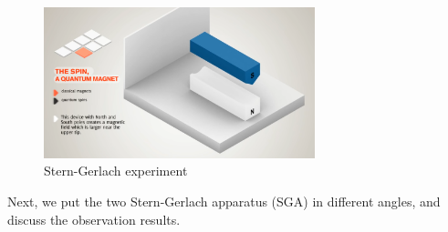\documentclass{easyclass}
\begin{document}
\begin{figure}[h!]
	\centering
	\includegraphics[width=0.7\textwidth]{figures/Stern-Gerlach-experiment.png}
	\caption{Stern-Gerlach experiment}
	\label{fig:Stern-Gerlach experiment}
\end{figure}

Next, we put the two Stern-Gerlach apparatus (SGA) in different angles, and discuss the observation results.
\end{document}
